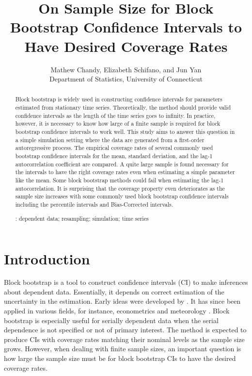 \documentclass[12pt, letterpaper, titlepage]{article}
\title{On Sample Size for Block Bootstrap Confidence Intervals 
  to Have Desired Coverage Rates}
\author{Mathew Chandy, Elizabeth Schifano,
  and Jun Yan\\[1ex]
  Department of Statistics, University of Connecticut\\
}
\date{}
\begin{document}
 
\maketitle


\begin{abstract}
Block bootstrap is widely used in constructing confidence intervals for
parameters estimated from stationary time series. Theoretically, the method
should provide valid confidence intervals as the length of the time series goes
to infinity. In practice, however, it is necessary to know how large of a
finite sample is required for block bootstrap confidence intervals to work
well. This study aims to answer this question in a simple simulation setting
where the data are generated from a first-order autoregressive process. The
empirical coverage rates of several commonly used bootstrap confidence
intervals for the mean, standard deviation, and the lag-1 autocorrelation
coefficient are compared. A quite large sample is found necessary for the
intervals to have the right coverage rates even when estimating a simple
parameter like the mean. Some block bootstrap methods could fail when
estimating the lag-1 autocorrelation. It is surprising that the coverage
property even deteriorates as the sample size increases with some commonly
used block bootstrap confidence intervals including the percentile intervals
and Bias-Corrected intervals.


\bigskip
{}:
dependent data; resampling; simulation; time series
\end{abstract}


\doublespace


\section{Introduction}
\label{sec:intro}


Block bootstrap is a tool to construct confidence intervals (CI) to make
inferences about dependent data. Essentially, it depends on correct estimation
of the uncertainty in the estimation. Early ideas were developed by
\citet{hall1985resampling, carlstein1986use,kunsch1989jackknife}. It has since
been applied in various fields, for instance, econometrics
\citep{mackinnon2006bootstrap} and meteorology \citep{varga2017generalised}.
Block bootstrap is especially useful for serially dependent data when the
serial dependence is not specified or not of primary interest. The method is
expected to produce CIs with coverage rates matching their nominal levels as
the sample size grows. However, when dealing with finite sample sizes, an
important question is how large the sample size must be for block bootstrap
CIs to have the desired coverage rates.
\end{document}
